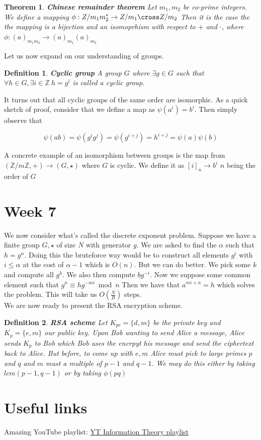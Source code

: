 \documentclass[titlepage]{article}
\newtheorem{theorem}{Theorem}[section]
\newtheorem{definition}{Definition}
\begin{document}
\begin{theorem}\textbf{Chinese remainder theorem}
Let $m_{1},m_{2}$ be co-prime integers. We define a mapping $\phi: Z/m_{1}m_{2}^{*} \to  Z/m_{1} \cross Z/m_{2} $ Then it is the case the the mapping is a bijection and an isomoprhism with respect to $+$ and $\cdot$, where $\phi:(a)_{m_{1}m_{2}} \to (a)_{m_{1}}(a)_{m_{2}}$
\end{theorem}

Let us now expand on our understanding of groups. 

\begin{definition}\textbf{Cyclic group}
A group $G$ where $\exists g \in G$ such that $\forall h \in G, \exists i \in \mathbb{Z} \ h = g^{i}$ is called a cyclic group. 
\end{definition}

It turns out that all cyclic groups of the same order are isomorphic. As a quick sketch of proof, consider that we define a map as $\psi(a^{i})=b^{i}$. Then simply observe that 

$$\psi(ab) = \psi(g^{i}g^{j}) = \psi(g^{i+j})=h^{i+j}=\psi(a)\psi(b)$$

A concrete example of an isomorphism between groups is the map from $(\mathbb{Z}/m\mathbb{Z},+) \to (G,\star)$ where $G$ is cyclic. We define it as $[i]_{n} \to b^{i}$ $n$ being the order of $G$


\section{Week 7}
We now consider what's called the discrete exponent problem. Suppose we have a finite group $G,\star$ of size $N$ with generator $g$. We are asked to find the $\alpha$ such that $h = g^{\alpha}$. Doing this the bruteforce way would be to construct all elements $g^{i}$ with $i\leq \alpha$ at the cost of $\alpha - 1$ which is $O(n)$. But we can do better. We pick some $k$ and compute all $g^{k}$. We also then compute $bg^{-i}$. Now we suppose some common element such that $g^{n} \equiv hg^{-mi} \bmod{n}$ Then we have that $a^{mi+n} = h$ which solves the problem. This will take us $O(\frac{N}{B})$ steps.
\\

We are now ready to present the RSA encryption scheme.
\begin{definition}\textbf{RSA scheme}
Let $K_{pr} = \{d,m\}$ be the private key and $K_{p} = \{e,m\}$ our public key. Upon Bob wanting to send Alice a message, Alice sends $K_{p}$ to Bob which Bob uses the encrpyt his message and send the ciphertext back to Alice. But before, to come up with $e,m$ Alice must pick to large primes $p$ and $q$ and $m$ must a multiple of $p-1$ and $q-1$. We may do this either by taking $lcm(p-1,q-1)$ or by taking $\phi(pq)$
\end{definition}








\section{Useful links}
Amazing YouTube playlist: \hyperlink{ https://www.youtube.com/playlist?list=PLE125425EC837021F}{YT Information Theory playlist}
\end{document}
